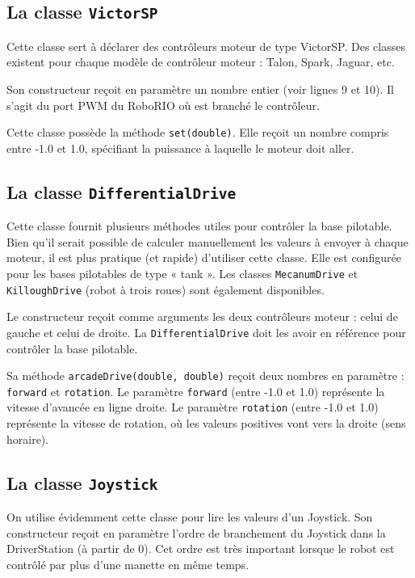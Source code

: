 \documentclass[12pt]{report}
\begin{document}
\subsection{La classe \texttt{VictorSP}}
Cette classe sert à déclarer des contrôleurs moteur de type VictorSP. Des classes existent pour chaque modèle de contrôleur moteur : Talon, Spark, Jaguar, etc.

Son constructeur reçoit en paramètre un nombre entier (voir lignes 9 et 10). Il s'agit du port PWM du RoboRIO où est branché le contrôleur.

Cette classe possède la méthode \texttt{set(double)}. Elle reçoit un nombre compris entre -1.0 et 1.0, spécifiant la puissance à laquelle le moteur doit aller.

\subsection{La classe \texttt{DifferentialDrive}}

Cette classe fournit plusieurs méthodes utiles pour contrôler la base pilotable. Bien qu'il serait possible de calculer manuellement les valeurs à envoyer à chaque moteur, il est plus pratique (et rapide) d'utiliser cette classe. Elle est configurée pour les bases pilotables de type « tank ». Les classes \texttt{MecanumDrive} et \texttt{KilloughDrive} (robot à trois roues) sont également disponibles.

Le constructeur reçoit comme arguments les deux contrôleurs moteur : celui de gauche et celui de droite. La \texttt{DifferentialDrive} doit les avoir en référence pour contrôler la base pilotable.

Sa méthode \texttt{arcadeDrive(double, double)} reçoit deux nombres en paramètre : \texttt{forward} et \texttt{rotation}. Le paramètre \texttt{forward} (entre -1.0 et 1.0) représente la vitesse d'avancée en ligne droite. Le paramètre \texttt{rotation} (entre -1.0 et 1.0) représente la vitesse de rotation, où les valeurs positives vont vers la droite (sens horaire). 

\subsection{La classe \texttt{Joystick}}

On utilise évidemment cette classe pour lire les valeurs d'un Joystick. Son constructeur reçoit en paramètre l'ordre de branchement du Joystick dans la DriverStation (à partir de 0). Cet ordre est très important lorsque le robot est contrôlé par plus d'une manette en même temps.
\end{document}
